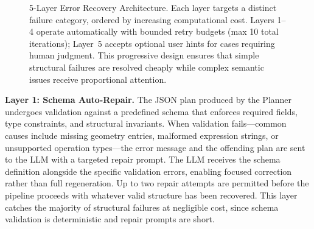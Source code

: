 \documentclass[5p,twocolumn,10pt,times]{elsarticle}
\begin{document}
\begin{figure}[t]
\centering
{}
\caption{5-Layer Error Recovery Architecture. Each layer targets a distinct failure category, ordered by increasing computational cost. Layers 1--4 operate automatically with bounded retry budgets (max 10 total iterations); Layer~5 accepts optional user hints for cases requiring human judgment. This progressive design ensures that simple structural failures are resolved cheaply while complex semantic issues receive proportional attention.}
\end{figure}


\textbf{Layer 1: Schema Auto-Repair.} The JSON plan produced by the Planner undergoes validation against a predefined schema that enforces required fields, type constraints, and structural invariants. When validation fails---common causes include missing geometry entries, malformed expression strings, or unsupported operation types---the error message and the offending plan are sent to the LLM with a targeted repair prompt. The LLM receives the schema definition alongside the specific validation errors, enabling focused correction rather than full regeneration. Up to two repair attempts are permitted before the pipeline proceeds with whatever valid structure has been recovered. This layer catches the majority of structural failures at negligible cost, since schema validation is deterministic and repair prompts are short.
\end{document}
